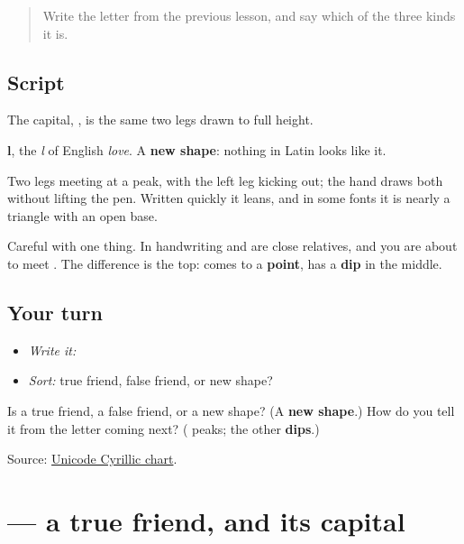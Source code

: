 \begin{quote}
Write the letter from the previous lesson, and say which of the three kinds it is.
\end{quote}

\subsection*{Script}

\begin{quote}
   
\end{quote}

The capital, \textbf{}, is the same two legs drawn to full height.

\textbf{l}, the \emph{l} of English \emph{love}. A \textbf{new shape}: nothing in Latin looks like it.

Two legs meeting at a peak, with the left leg kicking out; the hand draws both without lifting the pen. Written quickly it leans, and in some fonts it is nearly a triangle with an open base.

Careful with one thing. In handwriting \textbf{} and \textbf{} are close relatives, and you are about to meet \textbf{}. The difference is the top: \textbf{} comes to a \textbf{point}, \textbf{} has a \textbf{dip} in the middle.

\subsection*{Your turn}
\begin{itemize}
\raggedright
  \item \emph{Write it:} 
  \item \emph{Sort:} true friend, false friend, or new shape?
\end{itemize}

\begin{tcolorbox}[breakable,colback=teal!4,colframe=teal!35!black,title={Before you move on}]
Is \textbf{} a true friend, a false friend, or a new shape? (A \textbf{new shape}.) How do you tell it from the letter coming next? (\textbf{} peaks; the other \textbf{dips}.)

Source: \href{https://www.unicode.org/charts/PDF/U0400.pdf}{Unicode Cyrillic chart}.
\end{tcolorbox}
\section[\texorpdfstring{\ru{м} (m)}{м (m)}]{ — a true friend, and its capital}

